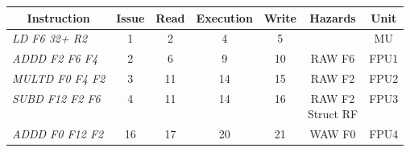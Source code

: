 \begin{enumerate}
        \begin{table}[H]
            \centering
            \begin{tabular}{l|cccc|cc}
            \multicolumn{1}{c|}{\textbf{Instruction}} & \textbf{Issue} & \textbf{Read} & \textbf{Execution} & \textbf{Write} & \textbf{Hazards}               & \textbf{Unit} \\ \hline
            \textit{LD F6 32+ R2}                     & 1              & 2             & 4                  & 5              &                                & MU            \\
            \textit{ADDD F2 F6 F4}                    & 2              & 6             & 9                  & 10             & RAW F6                         & FPU1          \\
            \textit{MULTD F0 F4 F2}                   & 3              & 11            & 14                 & 15             & RAW F2                         & FPU2          \\
            \textit{SUBD F12 F2 F6}                   & 4              & 11            & 14                 & 16             & \makecell{RAW F2 \\ Struct RF} & FPU3          \\
            \textit{ADDD F0 F12 F2}                   & 16             & 17            & 20                 & 21             & WAW F0                         & FPU4         
            \end{tabular}
        \end{table}
\end{enumerate}
